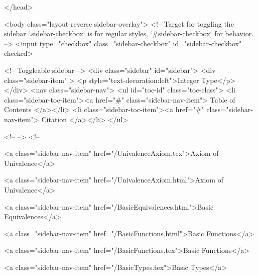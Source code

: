   
</head>




  <body class="layout-reverse sidebar-overlay">
    <!-- Target for toggling the sidebar `.sidebar-checkbox` is for regular
     styles, `#sidebar-checkbox` for behavior. -->
<input type="checkbox" class="sidebar-checkbox" id="sidebar-checkbox" checked>

<!-- Toggleable sidebar -->
<div class="sidebar" id="sidebar">
  <div class="sidebar-item" >
    <p style="text-decoration:left">Integer Type</p>
  </div>
  <nav class="sidebar-nav">
    <ul id="toc-id" class="toc-class">
  <li class="sidebar-toc-item"><a href="#" class="sidebar-nav-item"> Table of Contents </a></li>
  <li class="sidebar-toc-item"><a href="#" class="sidebar-nav-item"> Citation </a></li>
</ul>


    <!--  -->
    <!-- 
      
    
      
    
      
    
      
    
      
        
      
    
      
        
          <a class="sidebar-nav-item" href="/UnivalenceAxiom.tex">Axiom of Univalence</a>
        
      
    
      
        
          <a class="sidebar-nav-item" href="/UnivalenceAxiom.html">Axiom of Univalence</a>
        
      
    
      
        
          <a class="sidebar-nav-item" href="/BasicEquivalences.html">Basic Equivalences</a>
        
      
    
      
        
          <a class="sidebar-nav-item" href="/BasicFunctions.html">Basic Functions</a>
        
      
    
      
        
          <a class="sidebar-nav-item" href="/BasicFunctions.tex">Basic Functions</a>
        
      
    
      
        
          <a class="sidebar-nav-item" href="/BasicTypes.tex">Basic Types</a>
        
      
    
